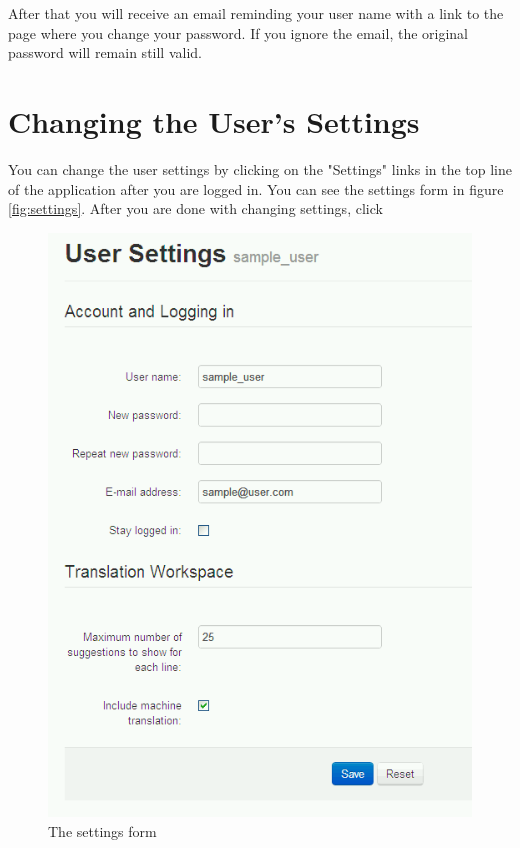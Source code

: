After that you will receive an email reminding your user name with a link to the page where you change your password. If you ignore the email, the original password will remain still valid.

\section{Changing the User's Settings}
\label{sec:settings}

You can change the user settings by clicking on the "Settings" links in the top line of the application after you are logged in. You can see the settings form in figure \ref{fig:settings}. After you are done with changing settings, click 

\begin{figure}[h]
\begin{center}
\includegraphics[scale=0.4]{figures/user_manual/user_settings.png}
\end{center}
\caption{The settings form}
\end{figure}

